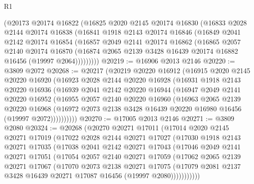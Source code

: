 \begin{lexlean}{R1}
\begin{coremodule}
    (@20173
      @20174
      @16822
      (@16825
        @2020
        @2145
        @20174
        @16830
        (@16833
          @2028
          @2144
          @20174
          @16838
          (@16841
            @1918
            @2143
            @20174
            @16846
            (@16849
              @2041
              @2142
              @20174
              @16854
              (@16857
                @2049
                @2141
                @20174
                @16862
                (@16865
                  @2057
                  @2140
                  @20174
                  @16870
                  (@16874 @2065 @2139 @3428 @16439 @20174 @16882 @16456 (@19997 @2064)))))))))
@20219 := @16906 @2013 @2146
@20220 := @3809 @2072
@20268 := @20217
    (@20219
      @20220
      @16912
      (@16915
        @2020
        @2145
        @20220
        @16920
        (@16923
          @2028
          @2144
          @20220
          @16928
          (@16931
            @1918
            @2143
            @20220
            @16936
            (@16939
              @2041
              @2142
              @20220
              @16944
              (@16947
                @2049
                @2141
                @20220
                @16952
                (@16955
                  @2057
                  @2140
                  @20220
                  @16960
                  (@16963
                    @2065
                    @2139
                    @20220
                    @16968
                    (@16972 @2073 @2138 @3428 @16439 @20220 @16980 @16456 (@19997 @2072))))))))))
@20270 := @17005 @2013 @2146
@20271 := @3809 @2080
@20324 := @20268
    (@20270
      @20271
      @17011
      (@17014
        @2020
        @2145
        @20271
        @17019
        (@17022
          @2028
          @2144
          @20271
          @17027
          (@17030
            @1918
            @2143
            @20271
            @17035
            (@17038
              @2041
              @2142
              @20271
              @17043
              (@17046
                @2049
                @2141
                @20271
                @17051
                (@17054
                  @2057
                  @2140
                  @20271
                  @17059
                  (@17062
                    @2065
                    @2139
                    @20271
                    @17067
                    (@17070
                      @2073
                      @2138
                      @20271
                      @17075
                      (@17079 @2081 @2137 @3428 @16439 @20271 @17087 @16456 (@19997 @2080)))))))))))

\end{coremodule}
\end{lexlean}
